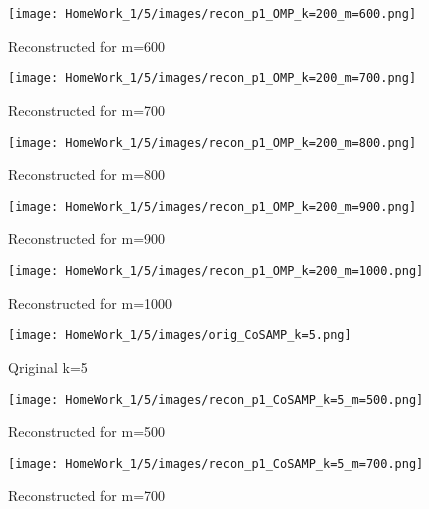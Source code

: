 \documentclass{article}
\begin{document}
\begin{figure}[h!]
    \begin{minipage}{0.1\textwidth}
        \centering
        \texttt{[image: HomeWork\_1/5/images/recon\_p1\_OMP\_k=200\_m=600.png]}
        \caption{Reconstructed for m=600}
    \end{minipage}
    \hspace{0.5cm}
    \begin{minipage}{0.1\textwidth}
        \centering
        \texttt{[image: HomeWork\_1/5/images/recon\_p1\_OMP\_k=200\_m=700.png]}
        \caption{Reconstructed for m=700}
    \end{minipage}
    \hspace{0.5cm}
    \begin{minipage}{0.1\textwidth}
        \centering
        \texttt{[image: HomeWork\_1/5/images/recon\_p1\_OMP\_k=200\_m=800.png]}
        \caption{\small Reconstructed for m=800}
    \end{minipage}
    \hspace{0.5cm}
    \begin{minipage}{0.1\textwidth}
        \centering
        \texttt{[image: HomeWork\_1/5/images/recon\_p1\_OMP\_k=200\_m=900.png]}
        \caption{Reconstructed for m=900}
    \end{minipage}
    \hspace{0.5cm}
    \begin{minipage}{0.1\textwidth}
        \centering
        \texttt{[image: HomeWork\_1/5/images/recon\_p1\_OMP\_k=200\_m=1000.png]}
        \caption{Reconstructed for m=1000}
    \end{minipage}
\end{figure}

\begin{figure}[h!]
    \centering
    \begin{minipage}{0.1\textwidth}
        \texttt{[image: HomeWork\_1/5/images/orig\_CoSAMP\_k=5.png]}
        \caption{Qriginal k=5}
    \end{minipage}
    \hspace{0.5cm}
    \begin{minipage}{0.1\textwidth}
        \centering
        \texttt{[image: HomeWork\_1/5/images/recon\_p1\_CoSAMP\_k=5\_m=500.png]}
        \caption{Reconstructed for m=500}
    \end{minipage}
    \hspace{0.5cm}
    \begin{minipage}{0.1\textwidth}
        \centering
        \texttt{[image: HomeWork\_1/5/images/recon\_p1\_CoSAMP\_k=5\_m=700.png]}
        \caption{Reconstructed for m=700}
    \end{minipage}
\end{figure}
\end{document}
